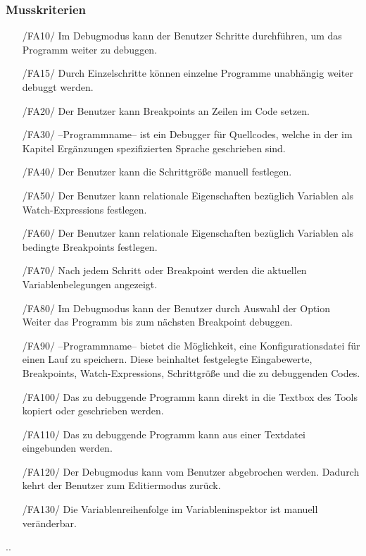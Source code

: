 \documentclass[parskip=full]{scrartcl}
\begin{document}
 		\subsubsection{Musskriterien}
		\begin{itemize}
		\item[/FA10/] Im Debugmodus kann der Benutzer Schritte durchführen, um das Programm weiter zu debuggen.
		\item[/FA15/] Durch Einzelschritte können einzelne Programme unabhängig weiter debuggt werden.
		\item[/FA20/] Der Benutzer kann Breakpoints an Zeilen im Code setzen.
		\item[/FA30/] --Programmname-- ist ein Debugger für Quellcodes, welche in der im Kapitel Ergänzungen spezifizierten Sprache geschrieben sind.
		\item[/FA40/] Der Benutzer kann die Schrittgröße manuell festlegen.
		\item[/FA50/] Der Benutzer kann relationale Eigenschaften bezüglich Variablen als Watch-Expressions festlegen.
		\item[/FA60/] Der Benutzer kann relationale Eigenschaften bezüglich Variablen als bedingte Breakpoints festlegen.
		\item[/FA70/] Nach jedem Schritt oder Breakpoint werden die aktuellen Variablenbelegungen angezeigt.
		\item[/FA80/] Im Debugmodus kann der Benutzer durch Auswahl der Option Weiter das Programm bis zum nächsten Breakpoint debuggen.
		\item[/FA90/]--Programmname-- bietet die Möglichkeit, eine Konfigurationsdatei für einen Lauf zu speichern. Diese beinhaltet festgelegte Eingabewerte, Breakpoints, Watch-Expressions, Schrittgröße und die zu debuggenden Codes.
		\item[/FA100/] Das zu debuggende Programm kann direkt in die Textbox des Tools kopiert oder geschrieben werden.
		\item[/FA110/] Das zu debuggende Programm kann aus einer Textdatei eingebunden werden.
		\item[/FA120/] Der Debugmodus kann vom Benutzer abgebrochen werden. Dadurch kehrt der Benutzer zum Editiermodus zurück.
		\item[/FA130/] Die Variablenreihenfolge im Variableninspektor ist manuell veränderbar.
		\end{itemize}
		..
\end{document}
